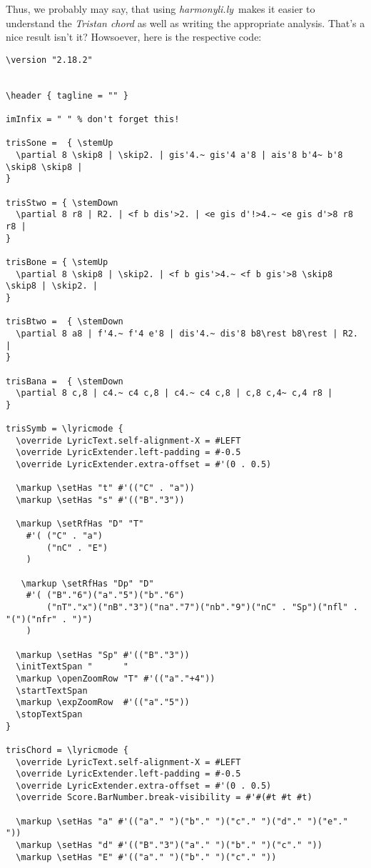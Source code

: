 \documentclass[
  DIV=calc,
  BCOR=5mm,
  12pt,
  headings=small,
  oneside,
  abstract=true,
  toc=bib,
  xcolor=dvipsnames,
  openany,
  ngerman,english]{scrartcl}
\newcommand{\acc}[0]{\textit}
\newcommand{\hlyn}[0]{\textit{harmonyli.ly}}
\begin{document}
Thus, we probably may say, that using \hlyn\ makes it easier to understand the
\acc{Tristan chord} as well as writing the appropriate analysis. That's a nice
result isn't it? Howsoever, here is the respective code:
 
\begin{scriptsize}
\begin{verbatim}
\version "2.18.2"


\header { tagline = "" }

imInfix = " " % don't forget this!

trisSone =  { \stemUp 
  \partial 8 \skip8 | \skip2. | gis'4.~ gis'4 a'8 | ais'8 b'4~ b'8 \skip8 \skip8 |
}

trisStwo = { \stemDown 
  \partial 8 r8 | R2. | <f b dis'>2. | <e gis d'!>4.~ <e gis d'>8 r8 r8 | 
}

trisBone = { \stemUp 
  \partial 8 \skip8 | \skip2. | <f b gis'>4.~ <f b gis'>8 \skip8 \skip8 | \skip2. |
}

trisBtwo =  { \stemDown 
  \partial 8 a8 | f'4.~ f'4 e'8 | dis'4.~ dis'8 b8\rest b8\rest | R2. |
}

trisBana =  { \stemDown 
  \partial 8 c,8 | c4.~ c4 c,8 | c4.~ c4 c,8 | c,8 c,4~ c,4 r8 |
}

trisSymb = \lyricmode {
  \override LyricText.self-alignment-X = #LEFT
  \override LyricExtender.left-padding = #-0.5
  \override LyricExtender.extra-offset = #'(0 . 0.5)

  \markup \setHas "t" #'(("C" . "a"))
  \markup \setHas "s" #'(("B"."3")) 

  \markup \setRfHas "D" "T" 
    #'( ("C" . "a")
        ("nC" . "E")
    ) 
  
   \markup \setRfHas "Dp" "D" 
    #'( ("B"."6")("a"."5")("b"."6")
        ("nT"."x")("nB"."3")("na"."7")("nb"."9")("nC" . "Sp")("nfl" . "(")("nfr" . ")")
    )   
 
  \markup \setHas "Sp" #'(("B"."3"))
  \initTextSpan "      "  
  \markup \openZoomRow "T" #'(("a"."+4"))
  \startTextSpan 
  \markup \expZoomRow  #'(("a"."5"))  
  \stopTextSpan   
}

trisChord = \lyricmode {
  \override LyricText.self-alignment-X = #LEFT
  \override LyricExtender.left-padding = #-0.5
  \override LyricExtender.extra-offset = #'(0 . 0.5)
  \override Score.BarNumber.break-visibility = #'#(#t #t #t)
  
  \markup \setHas "a" #'(("a"." ")("b"." ")("c"." ")("d"." ")("e"." "))
  \markup \setHas "d" #'(("B"."3")("a"." ")("b"." ")("c"." ")) 
  \markup \setHas "E" #'(("a"." ")("b"." ")("c"." "))   
  

\end{verbatim}
\end{scriptsize}
\end{document}
